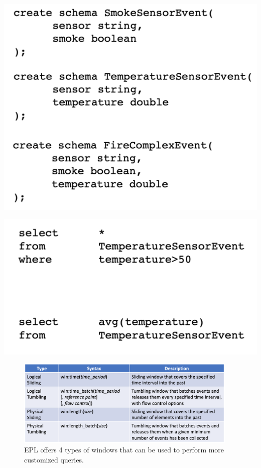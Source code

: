 \documentclass[10pt,a4paper]{article}
\begin{document}
\begin{minipage}{.5\textwidth}
  \centering
  \includegraphics[width=.8\linewidth]{images/epl-declare-ex}
\end{minipage}%
\begin{minipage}{.5\textwidth}
  \centering
  \includegraphics[width=.8\linewidth]{images/epl-query-ex}
\end{minipage}

\begin{figure}[ht!]
 \hfill \includegraphics[width=300pt]{images/epl-windows.png}\hspace*{\fill}
 \caption{EPL offers 4 types of windows that can be used to perform more customized queries.}
\end{figure} 
\end{document}
